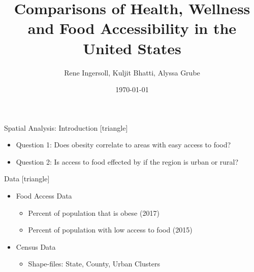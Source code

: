 \documentclass{beamer} %
\title[Comparisons of Health, Wellness and Food Accessibility in the United States]{Comparisons of Health, Wellness and Food Accessibility in the United States}
\institute[UNL]{University of Nebraska-Lincoln}
\author{Rene Ingersoll, Kuljit Bhatti, Alyssa Grube}
\date{\today}
\begin{document}


 

\begin{frame}

                \titlepage

\end{frame}

 


 

 

\begin{frame}

 

\end{frame}

 

\begin{frame}{Spatial Analysis: Introduction}
[triangle]
  \begin{itemize}
  \item Question 1: Does obesity correlate to areas with easy access to food?
  \item Question 2: Is access to food effected by if the region is urban or rural?
  \end{itemize}
\end{frame}

\begin{frame}{Data}
[triangle]
\begin{itemize}
  \item Food Access Data
    \begin{itemize}
        \item Percent of population that is obese (2017)
        \item Percent of population with low access to food (2015)
    \end{itemize}
    \item Census Data
        \begin{itemize}
            \item Shape-files: State, County, Urban Clusters
        \end{itemize}
\end{itemize}
\end{frame}

\end{document}
